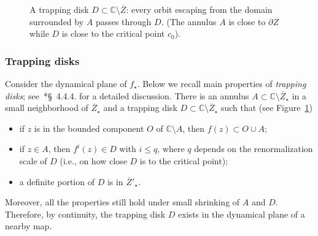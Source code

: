 \documentclass{amsart}
\newcommand{\1}{{\mathbb 1 }}
\newcommand{\str}{{\star}}
\newcommand{\C}{\mathbb{C}}
\theoremstyle{remark}
\numberwithin{equation}{section}
\theoremstyle{definition}
\theoremstyle{nonumberbreak}
\begin{document}
\begin{figure}[tp!]
\caption{A trapping disk $D\subset \C\setminus \overline Z$: every orbit escaping from the domain surrounded by $A$ passes through $D$. (The annulus $A$ is close to $\partial Z$ while $D$ is close to the critical point $c_0$).}
\label{Fig:Trapping disk}
\end{figure}




\subsubsection{Trapping disks}
\label{sss:TrapDisks}
Consider the dynamical plane of $f_\str$. Below we recall main properties of \emph{trapping disks}; see~\cite{AL-posmeas}*{\S~4.4.4.} for a detailed discussion.
There is an annulus $A\subset \C\setminus \overline Z_\str$ in a small neighborhood of $\overline Z_\str$ and a trapping disk $D\subset  \C\setminus \overline Z_\str$ such that (see Figure~\ref{Fig:Trapping disk})
\begin{itemize}
\item if $z$ is in the bounded component $O$ of $\C\setminus A$, then $f(z)\subset O\cup A$;  
\item if $z\in A$, then $f^i(z)\in D$ with $i\le q$, where $q$ depends on the renormalization scale of $D$ (i.e., on how close $D$ is to the critical point);
\item a definite portion of $D$ is in $\overline Z'_\str$.  
\end{itemize}
 Moreover, all the properties still hold under small shrinking of $A$ and $D$. Therefore, by continuity, the trapping disk $D$ exists in the dynamical plane of a nearby map. 
 
\end{document}

